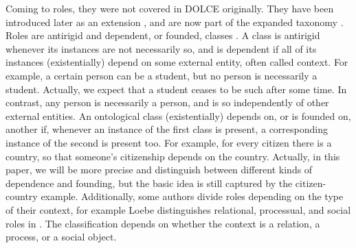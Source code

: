 \documentclass[sw]{iosart2x}
\newcommand{\DOLCE}{\textsc{DOLCE}\xspace} %
\begin{document}
Coming to roles, they were not covered in \DOLCE originally. They have been introduced later as an extension \cite{masoloSocialRolesTheir2004}, and are now part of the expanded taxonomy \cite{borgoDOLCEDescriptiveOntology2022}.
Roles are antirigid and dependent, or founded, classes \cite{guarinoOverviewOntoClean2009, guarinoFormalOntologyProperties2000,masoloSocialRolesTheir2004}. 
A class is antirigid whenever its instances are not necessarily so, and is dependent if all of its instances (existentially) depend on some external entity, often called context.
For example, a certain person can be a student, but no person is necessarily a student. Actually, we expect that a student ceases to be such after some time. 
In contrast, any person is necessarily a person, and is so independently of other external entities.
An ontological class (existentially) depends on, or is founded on, another if, whenever an instance of the first class is present, a corresponding instance of the second is present too.
For example, for every citizen there is a country, so that someone's citizenship depends on the country. Actually, in this paper, we will be more precise and distinguish between different kinds of dependence and founding, but the basic idea is still captured by the citizen-country example. 
Additionally, some authors divide roles depending on the type of their context, 
for example Loebe distinguishes relational, processual, and social roles in \cite{loebeAbstractVsSocial2007}. The classification depends on whether the context is a relation, a process, or a social object. 
\end{document}
